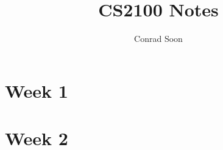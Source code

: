 \documentclass{article}
\title{CS2100 Notes}
\author{Conrad Soon}
\begin{document}
\begin{multicols*}{3}
\maketitle
\section{Week 1}
\section{Week 2}
\end{multicols*}
\end{document}
